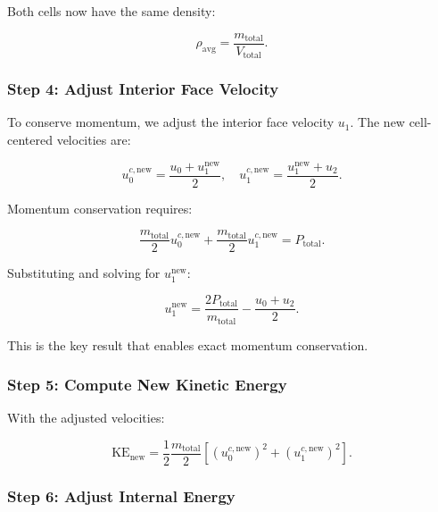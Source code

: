 \documentclass[12pt,a4paper]{article}
\newcommand{\half}{\frac{1}{2}}
\begin{document}
Both cells now have the same density:

\begin{equation}
    \rho_{\text{avg}} = \frac{m_{\text{total}}}{V_{\text{total}}}.
\end{equation}

\subsubsection{Step 4: Adjust Interior Face Velocity}

To conserve momentum, we adjust the interior face velocity $u_1$. The new cell-centered velocities are:

\begin{equation}
    u_0^{c,\text{new}} = \frac{u_0 + u_1^{\text{new}}}{2}, \quad u_1^{c,\text{new}} = \frac{u_1^{\text{new}} + u_2}{2}.
\end{equation}

Momentum conservation requires:

\begin{equation}
    \frac{m_{\text{total}}}{2} u_0^{c,\text{new}} + \frac{m_{\text{total}}}{2} u_1^{c,\text{new}} = P_{\text{total}}.
\end{equation}

Substituting and solving for $u_1^{\text{new}}$:

\begin{equation}
    u_1^{\text{new}} = \frac{2 P_{\text{total}}}{m_{\text{total}}} - \frac{u_0 + u_2}{2}.
    \label{eq:u_new}
\end{equation}

This is the key result that enables exact momentum conservation.

\subsubsection{Step 5: Compute New Kinetic Energy}

With the adjusted velocities:

\begin{equation}
    \text{KE}_{\text{new}} = \half \frac{m_{\text{total}}}{2} \left[ (u_0^{c,\text{new}})^2 + (u_1^{c,\text{new}})^2 \right].
\end{equation}

\subsubsection{Step 6: Adjust Internal Energy}
\end{document}
